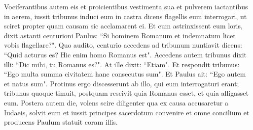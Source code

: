 \begin{biblechapter}
\verse Vociferantibus autem eis et proicientibus vestimenta sua et pulverem iactantibus in aerem,  
\verse iussit tribunus induci eum in castra dicens flagellis eum interrogari, ut sciret propter quam causam sic acclamarent ei. 
\verse Et cum astrinxissent eum loris, dixit astanti centurioni Paulus: “Si hominem Romanum et indemnatum licet vobis flagellare?". 
\verse Quo audito, centurio accedens ad tribunum nuntiavit dicens: “Quid acturus es? Hic enim homo Romanus est". 
\verse Accedens autem tribunus dixit illi: “Dic mihi, tu Romanus es?". At ille dixit: “Etiam". 
\verse Et respondit tribunus: “Ego multa summa civitatem hanc consecutus sum". Et Paulus ait: “Ego autem et natus sum".  
\verse Protinus ergo discesserunt ab illo, qui eum interrogaturi erant; tribunus quoque timuit, postquam rescivit quia Romanus esset, et quia alligasset eum. 
\verse Postera autem die, volens scire diligenter qua ex causa accusaretur a Iudaeis, solvit eum et iussit principes sacerdotum convenire et omne concilium et producens Paulum statuit coram illis. 
\end{biblechapter}

